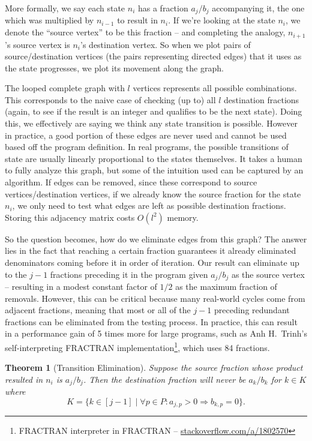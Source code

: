 \documentclass[12pt]{article}
\newtheorem{theorem}{Theorem}
\begin{document}
More formally, we say each state $n_i$ has a fraction $a_j/b_j$ accompanying it, the one which was multiplied by $n_{i-1}$ to result in $n_i$. If we're looking at the state $n_i$, we denote the ``source vertex'' to be this fraction -- and completing the analogy, $n_{i+1}$'s source vertex is $n_i$'s destination vertex. So when we plot pairs of source/destination vertices (the pairs representing directed edges) that it uses as the state progresses, we plot its movement along the graph.

The looped complete graph with $l$ vertices represents all possible combinations. This corresponds to the naive case of checking (up to) all $l$ destination fractions (again, to see if the result is an integer and qualifies to be the next state). Doing this, we effectively are saying we think any state transition is possible. However in practice, a good portion of these edges are never used and cannot be used based off the program definition. In real programs, the possible transitions of state are usually linearly proportional to the states themselves. It takes a human to fully analyze this graph, but some of the intuition used can be captured by an algorithm. If edges can be removed, since these correspond to source vertices/destination vertices, if we already know the source fraction for the state $n_i$, we only need to test what edges are left as possible destination fractions. Storing this adjacency matrix costs $O(l^2)$ memory.

So the question becomes, how do we eliminate edges from this graph? The answer lies in the fact that reaching a certain fraction guarantees it already eliminated denominators coming before it in order of iteration. Our result can eliminate up to the $j-1$ fractions preceding it in the program given $a_j/b_j$ as the source vertex -- resulting in a modest constant factor of $1/2$ as the maximum fraction of removals. However, this can be critical because many real-world cycles come from adjacent fractions, meaning that most or all of the $j-1$ preceding redundant fractions can be eliminated from the testing process. In practice, this can result in a performance gain of 5 times more for large programs, such as Anh H.\ Trinh's self-interpreting FRACTRAN implementation\footnote{FRACTRAN interpreter in FRACTRAN -- \url{stackoverflow.com/a/1802570}}, which uses 84 fractions.

\begin{theorem}[Transition Elimination]
Suppose the source fraction whose product resulted in $n_i$ is $a_j/b_j$. Then the destination fraction will never be $a_k/b_k$ for $k \in K$ where
\[
K = \{k \in [j-1] \mid \forall p \in P : a_{j,p} > 0 \Rightarrow b_{k,p} = 0\}.
\]
\end{theorem}
\end{document}

